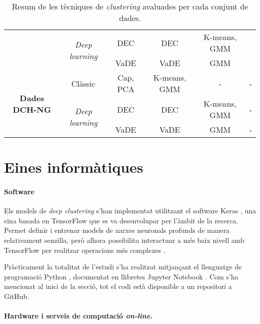\documentclass[CAT,BIB]{TFUOC}%
\begin{document}
\begin{sidewaystable}[p]
\begin{tabular}{@{}cccccc@{}}
                & \multirow{2}{*}{\textit{Deep learning}} & DEC & DEC & K-means, GMM &  \\
                &  & VaDE & VaDE & GMM &  \\ \midrule
                \multirow{3}{*}{\textbf{Dades DCH-NG}} & Clàssic & Cap, PCA & K-means, GMM & - & - \\
                & \multirow{2}{*}{\textit{Deep learning}} & DEC & DEC & K-means, GMM & - \\
                &  & VaDE & VaDE & GMM & - \\ \bottomrule
            \end{tabular}
            \caption[Tècniques de \textit{clustering} per conjunt de dades]{Resum de les tècniques de \textit{clustering}
                avaluades per cada conjunt de dades.}
            \label{t:metodes_resum}
        \end{sidewaystable}

    \section{Eines informàtiques}
    \label{s:software}

        \paragraph{Software}
            Els models de \textit{deep clustering}
            s'han implementat utilitzant el software Keras \citep{Chollet2015},
            una eina basada en TensorFlow \citep{Ghemawat2016}
            que es va desenvolupar per l'àmbit de la recerca.
            Permet definir i entrenar models de xarxes neuronals profunds
            de manera relativament senzilla,
            però alhora possibilita interactuar a més baix nivell amb TensorFlow
            per realitzar operacions més complexes \citep{Ketkar2021}.

            Pràcticament la totalitat de l'estudi
            s'ha realitzat mitjançant el llenguatge de programació Python \citep{VanRossum2009},
            documentat en llibretes Jupyter Notebook \citep{Kluyver2016}.
            Com s'ha mencionat al inici de la secció,
            tot el codi està disponible a un repositori a GitHub.

        \paragraph{Hardware i serveis de computació \textit{on-line}.}
\end{document}
